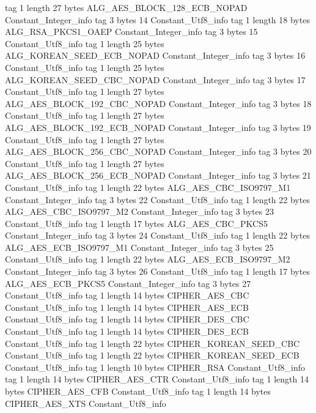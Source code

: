 {{{			tag	1
			length	27
			bytes	ALG_AES_BLOCK_128_ECB_NOPAD
		}
		Constant_Integer_info {
			tag	3
			bytes	14
		}
		Constant_Utf8_info {
			tag	1
			length	18
			bytes	ALG_RSA_PKCS1_OAEP
		}
		Constant_Integer_info {
			tag	3
			bytes	15
		}
		Constant_Utf8_info {
			tag	1
			length	25
			bytes	ALG_KOREAN_SEED_ECB_NOPAD
		}
		Constant_Integer_info {
			tag	3
			bytes	16
		}
		Constant_Utf8_info {
			tag	1
			length	25
			bytes	ALG_KOREAN_SEED_CBC_NOPAD
		}
		Constant_Integer_info {
			tag	3
			bytes	17
		}
		Constant_Utf8_info {
			tag	1
			length	27
			bytes	ALG_AES_BLOCK_192_CBC_NOPAD
		}
		Constant_Integer_info {
			tag	3
			bytes	18
		}
		Constant_Utf8_info {
			tag	1
			length	27
			bytes	ALG_AES_BLOCK_192_ECB_NOPAD
		}
		Constant_Integer_info {
			tag	3
			bytes	19
		}
		Constant_Utf8_info {
			tag	1
			length	27
			bytes	ALG_AES_BLOCK_256_CBC_NOPAD
		}
		Constant_Integer_info {
			tag	3
			bytes	20
		}
		Constant_Utf8_info {
			tag	1
			length	27
			bytes	ALG_AES_BLOCK_256_ECB_NOPAD
		}
		Constant_Integer_info {
			tag	3
			bytes	21
		}
		Constant_Utf8_info {
			tag	1
			length	22
			bytes	ALG_AES_CBC_ISO9797_M1
		}
		Constant_Integer_info {
			tag	3
			bytes	22
		}
		Constant_Utf8_info {
			tag	1
			length	22
			bytes	ALG_AES_CBC_ISO9797_M2
		}
		Constant_Integer_info {
			tag	3
			bytes	23
		}
		Constant_Utf8_info {
			tag	1
			length	17
			bytes	ALG_AES_CBC_PKCS5
		}
		Constant_Integer_info {
			tag	3
			bytes	24
		}
		Constant_Utf8_info {
			tag	1
			length	22
			bytes	ALG_AES_ECB_ISO9797_M1
		}
		Constant_Integer_info {
			tag	3
			bytes	25
		}
		Constant_Utf8_info {
			tag	1
			length	22
			bytes	ALG_AES_ECB_ISO9797_M2
		}
		Constant_Integer_info {
			tag	3
			bytes	26
		}
		Constant_Utf8_info {
			tag	1
			length	17
			bytes	ALG_AES_ECB_PKCS5
		}
		Constant_Integer_info {
			tag	3
			bytes	27
		}
		Constant_Utf8_info {
			tag	1
			length	14
			bytes	CIPHER_AES_CBC
		}
		Constant_Utf8_info {
			tag	1
			length	14
			bytes	CIPHER_AES_ECB
		}
		Constant_Utf8_info {
			tag	1
			length	14
			bytes	CIPHER_DES_CBC
		}
		Constant_Utf8_info {
			tag	1
			length	14
			bytes	CIPHER_DES_ECB
		}
		Constant_Utf8_info {
			tag	1
			length	22
			bytes	CIPHER_KOREAN_SEED_CBC
		}
		Constant_Utf8_info {
			tag	1
			length	22
			bytes	CIPHER_KOREAN_SEED_ECB
		}
		Constant_Utf8_info {
			tag	1
			length	10
			bytes	CIPHER_RSA
		}
		Constant_Utf8_info {
			tag	1
			length	14
			bytes	CIPHER_AES_CTR
		}
		Constant_Utf8_info {
			tag	1
			length	14
			bytes	CIPHER_AES_CFB
		}
		Constant_Utf8_info {
			tag	1
			length	14
			bytes	CIPHER_AES_XTS
		}
		Constant_Utf8_info {
}}}
